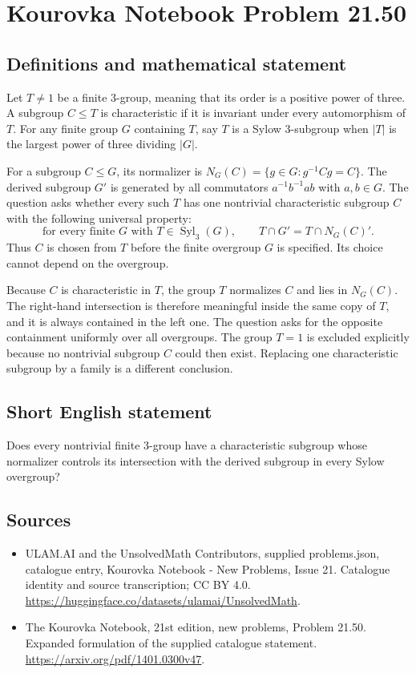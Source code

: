 \documentclass[11pt,a4paper]{article}
\begin{document}
\section*{Kourovka Notebook Problem 21.50}\label{statement}

\subsection{Definitions and mathematical statement}
Let $T\ne1$ be a finite $3$-group, meaning that its order is a positive
power of three. A subgroup $C\le T$ is characteristic if it is invariant
under every automorphism of $T$. For any finite group $G$ containing
$T$, say $T$ is a Sylow $3$-subgroup when $|T|$ is the largest power
of three dividing $|G|$.

For a subgroup $C\le G$, its normalizer is
$N_G(C)=\{g\in G:g^{-1}Cg=C\}$. The derived subgroup $G'$ is generated
by all commutators $a^{-1}b^{-1}ab$ with $a,b\in G$.
The question asks whether every such $T$ has one nontrivial characteristic
subgroup $C$ with the following universal property:
\[
 \text{for every finite }G\text{ with }T\in\operatorname{Syl}_3(G),
 \qquad T\cap G'=T\cap N_G(C)'.
\]
Thus $C$ is chosen from $T$ before the finite overgroup $G$ is specified.
Its choice cannot depend on the overgroup.

Because $C$ is characteristic in $T$, the group $T$ normalizes $C$ and
lies in $N_G(C)$. The right-hand intersection is therefore meaningful
inside the same copy of $T$, and it is always contained in the left
one. The question asks for the opposite containment uniformly over
all overgroups. The group $T=1$ is excluded explicitly because no
nontrivial subgroup $C$ could then exist. Replacing one characteristic
subgroup by a family is a different conclusion.
\subsection{Short English statement}
Does every nontrivial finite $3$-group have a characteristic subgroup whose normalizer controls its intersection with the derived subgroup in every Sylow overgroup?
\subsection{Sources}
\begin{itemize}
\item[S1] ULAM.AI and the UnsolvedMath Contributors, supplied problems.json, catalogue entry, Kourovka Notebook - New Problems, Issue 21. Catalogue identity and source transcription; CC BY 4.0.
\url{https://huggingface.co/datasets/ulamai/UnsolvedMath}.
\item[S2] The Kourovka Notebook, 21st edition, new problems, Problem 21.50. Expanded formulation of the supplied catalogue statement.
\url{https://arxiv.org/pdf/1401.0300v47}.
\end{itemize}
\end{document}

